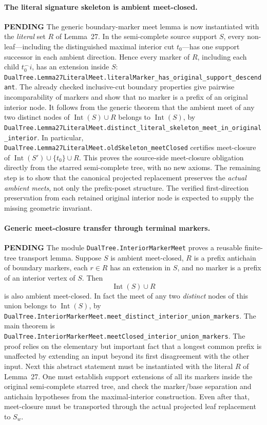 \documentclass[11pt]{article}
\newcommand{\todo}{\textcolor{gray!70!black}{\textbf{PENDING}}}
\newcommand{\lean}[1]{\texttt{#1}}
\begin{document}
\paragraph{The literal signature skeleton is ambient meet-closed.} \todo
The generic boundary-marker meet lemma is now instantiated with
the \emph{literal} set $R$ of Lemma~27.  In the semi-complete
source support $S$, every non-leaf—including the distinguished
maximal interior cut $t_0$—has one support successor in each
ambient direction.  Hence every marker of $R$, including each
child $t_0^\frown i$, has an extension inside $S$:
\lean{DualTree.Lemma27LiteralMeet.literalMarker_has_original_support_descendant}.
The already checked inclusive-cut boundary properties give
pairwise incomparability of markers and show that no marker
is a prefix of an original interior node.
It follows from the generic theorem that the ambient meet
of any two distinct nodes of
$\operatorname{Int}(S)\cup R$ belongs to $\operatorname{Int}(S)$,
by
\lean{DualTree.Lemma27LiteralMeet.distinct_literal_skeleton_meet_in_original_interior}.
In particular,
\lean{DualTree.Lemma27LiteralMeet.oldSkeleton_meetClosed}
certifies meet-closure of
$\operatorname{Int}(S')\cup\{t_0\}\cup R$.
This proves the source-side meet-closure obligation directly from
the starred semi-complete tree, with no new axioms.
The remaining step is to show that the canonical projected
replacement preserves the \emph{actual ambient meets}, not only
the prefix-poset structure.  The verified first-direction
preservation from each retained original interior node is
expected to supply the missing geometric invariant.



\paragraph{Generic meet-closure transfer through terminal markers.} \todo
The module \lean{DualTree.InteriorMarkerMeet} proves a reusable
finite-tree transport lemma.  Suppose $S$ is ambient meet-closed,
$R$ is a prefix antichain of boundary markers, each $r\in R$ has
an extension in $S$, and no marker is a prefix of an interior
vertex of $S$.  Then
\[
     \operatorname{Int}(S)\cup R
\]
is also ambient meet-closed.
In fact the meet of any two \emph{distinct} nodes of this union
belongs to $\operatorname{Int}(S)$, by
\lean{DualTree.InteriorMarkerMeet.meet_distinct_interior_union_markers}.
The main theorem is
\lean{DualTree.InteriorMarkerMeet.meetClosed_interior_union_markers}.
The proof relies on the elementary but important fact that a
longest common prefix is unaffected by extending an input
beyond its first disagreement with the other input.
Next this abstract statement must be instantiated with the literal
$R$ of Lemma~27.  One must establish support extensions of all its
markers inside the original semi-complete starred tree, and check
the marker/base separation and antichain hypotheses from the
maximal-interior construction.
Even after that, meet-closure must be transported through the
actual projected leaf replacement to $S_w$.
\end{document}
